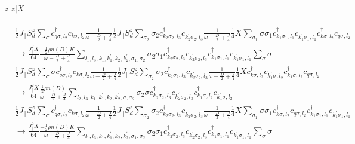 \documentclass[12pt]{revtex4-2}
\begin{document}
\paragraph{\(z|z|X\)}
\begin{equation}\begin{aligned}
	&\frac{1}{2}J_\parallel S_d^z \sum_\sigma c^\dagger_{q \sigma, l_2}c_{k \sigma, l_2}\frac{1}{\omega - \frac{D}{2} + \frac{J}{4}}\frac{1}{2}J_\parallel S_d^z \sum_{\sigma_2} \sigma_2 c^\dagger_{k_2 \sigma_2, l_3}c_{k_2^\prime \sigma_2, l_3} \frac{1}{\omega - \frac{D}{2} + \frac{J}{4}} \frac{1}{4}X \sum_{\sigma_1}\sigma \sigma_1 c^\dagger_{k_1\sigma_1,l_1}c_{k_1^\prime\sigma_1,l_1}c^\dagger_{k\sigma,l_2}c_{q\sigma,l_2} \\
	&\longrightarrow \frac{J_\parallel^2 X}{64} \frac{-\frac{1}{2}\rho n(D) K}{\omega - \frac{D}{2} + \frac{J}{4}}\sum_{l_1, l_3, k_1,k_1^\prime,k_2,k_2^\prime,\sigma_1,\sigma_2} \sigma_2 \sigma_1 c^\dagger_{k_2 \sigma_2, l_3}c_{k_2^\prime \sigma_2, l_3} c^\dagger_{k_1\sigma_1,l_1}c_{k_1^\prime\sigma_1,l_1}\sum_\sigma\sigma
\end{aligned}\end{equation}
\begin{equation}\begin{aligned}
	&\frac{1}{2}J_\parallel S_d^z \sum_\sigma \sigma c^\dagger_{q \sigma, l_2}c_{k \sigma, l_2}\frac{1}{\omega - \frac{D}{2} + \frac{J}{4}}\frac{1}{2}J_\parallel S_d^z \sum_{\sigma_2} \sigma_2 c^\dagger_{k_2 \sigma_2, l_3}c_{k_2^\prime \sigma_2, l_3} \frac{1}{\omega - \frac{D}{2} + \frac{J}{4}} \frac{1}{4}X c^\dagger_{k\sigma,l_2}c_{k_1^\prime\sigma,l_2}c^\dagger_{k_1\sigma,l_2}c_{q\sigma,l_2} \\
	&\longrightarrow \frac{J_\parallel^2 X}{64} \frac{\frac{1}{2}\rho n(D)}{\omega - \frac{D}{2} + \frac{J}{4}}\sum_{l_2, l_3, k_1,k_1^\prime,k_2,k_2^\prime,\sigma,\sigma_2} \sigma_2 \sigma c^\dagger_{k_2 \sigma_2, l_3}c_{k_2^\prime \sigma_2, l_3} c^\dagger_{k_1\sigma,l_2}c_{k_1^\prime\sigma,l_2}
\end{aligned}\end{equation}
\begin{equation}\begin{aligned}
	&\frac{1}{2}J_\parallel S_d^z \sum_\sigma c^\dagger_{q \sigma, l_2}c_{k \sigma, l_2}\frac{1}{\omega - \frac{D}{2} + \frac{J}{4}}\frac{1}{2}J_\parallel S_d^z \sum_{\sigma_2} \sigma_2 c^\dagger_{k_2 \sigma_2, l_3}c_{k_2^\prime \sigma_2, l_3} \frac{1}{\omega - \frac{D}{2} + \frac{J}{4}} \frac{1}{4}X \sum_{\sigma_1}\sigma \sigma_1 c^\dagger_{k\sigma,l_2}c_{q\sigma,l_2} c^\dagger_{k_1\sigma_1,l_1}c_{k_1^\prime\sigma_1,l_1}\\
	&\longrightarrow \frac{J_\parallel^2 X}{64} \frac{-\frac{1}{2}\rho n(D) K}{\omega - \frac{D}{2} + \frac{J}{4}}\sum_{l_1, l_3, k_1,k_1^\prime,k_2,k_2^\prime,\sigma_1,\sigma_2} \sigma_2 \sigma_1 c^\dagger_{k_2 \sigma_2, l_3}c_{k_2^\prime \sigma_2, l_3} c^\dagger_{k_1\sigma_1,l_1}c_{k_1^\prime\sigma_1,l_1}\sum_\sigma\sigma
\end{aligned}\end{equation}
\end{document}
